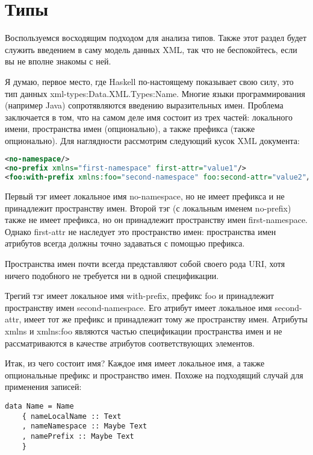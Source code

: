 \section{Типы} %

Воспользуемся восходящим подходом для анализа типов. Также этот раздел будет служить введением в саму модель данных XML, так что не беспокойтесь, если вы не вполне знакомы с ней.

Я думаю, первое место, где Haskell по-настоящему показывает свою силу, это тип данных xml-types:Data.XML.Types:Name. Многие языки программирования (например Java) сопротявляются введению выразительных имен. Проблема заключается в том, что на самом деле имя состоит из трех частей: локального имени, пространства имен (опционально), а также префикса (также опционально). Для наглядности рассмотрим следующий кусок XML документа:

\begin{lstlisting}[language=XML]
<no-namespace/>
<no-prefix xmlns="first-namespace" first-attr="value1"/>
<foo:with-prefix xmlns:foo="second-namespace" foo:second-attr="value2"/>
\end{lstlisting}

Первый тэг имеет локальное имя no-namespace, но не имеет префикса и не принадлежит пространству имен. Второй тэг (с локальным именем no-prefix) также не имеет префикса, но он принадлежит пространству имен first-namespace. Однако first-attr не наследует это пространство имен: пространства имен атрибутов всегда должны точно задаваться с помощью префикса.

\begin{remark}
Пространства имен почти всегда представляют собой своего рода URI, хотя ничего подобного не требуется ни в одной спецификации.
\end{remark}

Трегий тэг имеет локальное имя with-prefix, префикс foo и принадлежит пространству имен second-namespace. Его атрибут имеет локальное имя second-attr, имеет тот же префикс и принадлежит тому же пространству имен. Атрибуты xmlns и xmlns:foo являются частью спецификации пространства имен и не рассматриваются в качестве атрибутов соответствующих элементов.

Итак, из чего состоит имя? Каждое имя имеет локальное имя, а также опциональные префикс и пространство имен. Похоже на подходящий случай для применения записей:

\begin{lstlisting}
data Name = Name
    { nameLocalName :: Text
    , nameNamespace :: Maybe Text
    , namePrefix :: Maybe Text
    }
\end{lstlisting}

